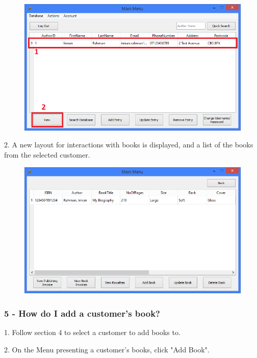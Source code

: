 \begin{figure}[H]
    \includegraphics[width=\textwidth]{./Manual/Tutorial/Q4/View.png}
\end{figure}

2. A new layout for interactions with books is displayed, and a list of the books from the selected customer. 

\begin{figure}[H]
    \includegraphics[width=\textwidth]{./Manual/Tutorial/Q4/CustomerBooks.png}
\end{figure}

\subsubsection{5 -  How do I add a customer's book?} \label{sssec:Q5}

1. Follow section 4 to select a customer to add books to.

2. On the Menu presenting a customer's books, click "Add Book".


